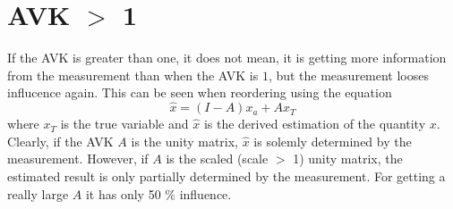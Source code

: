 \documentclass[a4paper]{article}
\begin{document}
\section{AVK $>$ 1}

If the AVK is greater than one, it does not mean, it is getting more
information from the measurement than when the AVK is $1$, but the
measurement looses influcence again. This can be seen when reordering using the equation
\begin{equation}
  \hat{x} = (I - A) x_a + A x_T
\end{equation}
where $x_T$ is the true variable and $\hat{x}$ is the derived
estimation of the quantity $x$. Clearly, if the AVK $A$ is the unity
matrix, $\hat{x}$ is solemly determined by the measurement. However,
if $A$ is the scaled (scale
$>$ 1) unity matrix, the estimated result is only partially
determined by the measurement. For getting a really large $A$ it has
only 50 \% influence.
\end{document}
